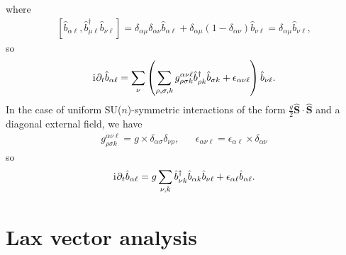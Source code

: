 \documentclass[aps,pra,nofootinbib,twocolumn,superscriptaddress]{revtex4-2}
\newcommand{\p}[1]{\left(#1\right)} %
\renewcommand{\sp}[1]{\left[#1\right]} %
\renewcommand{\v}{\bm} %
\renewcommand{\i}{\mathrm{i}\mkern1mu} %
\newcommand{\1}{\mathds{1}}
\renewcommand{\b}{\hat b}
\renewcommand{\S}{\hat S}
\begin{document}
where
\begin{align}
  \sp{\b_{\alpha\ell}, \b_{\mu\ell}^\dag \b_{\nu\ell}}
  = \delta_{\alpha\mu} \delta_{\alpha\nu} \b_{\alpha\ell}
  + \delta_{\alpha\mu} \p{1-\delta_{\alpha\nu}} \b_{\nu\ell}
  = \delta_{\alpha\mu} \b_{\nu\ell},
\end{align}
so
\begin{align}
  \i \partial_t \b_{\alpha\ell}
  = \sum_\nu \p{\sum_{\rho,\sigma,k}
    g^{\alpha\nu\ell}_{\rho\sigma k} \b_{\rho k}^\dag \b_{\sigma k}
    + \epsilon_{\alpha\nu\ell}} \b_{\nu\ell}.
\end{align}
In the case of uniform SU($n$)-symmetric interactions of the form $\frac{g}{2}\v\S\cdot\v\S$ and a diagonal external field, we have
\begin{align}
  g^{\alpha\nu\ell}_{\rho\sigma k}
  = g \times \delta_{\alpha\sigma} \delta_{\nu\rho},
  &&
  \epsilon_{\alpha\nu\ell}
  = \epsilon_{\alpha\ell} \times \delta_{\alpha\nu}
\end{align}
so
\begin{align}
  \i \partial_t \b_{\alpha\ell}
  = g \sum_{\nu,k} \b_{\nu k}^\dag \b_{\alpha k} \b_{\nu\ell}
  + \epsilon_{\alpha\ell} \b_{\alpha\ell}.
\end{align}

\section{Lax vector analysis}
\label{sec:lax}
\end{document}
